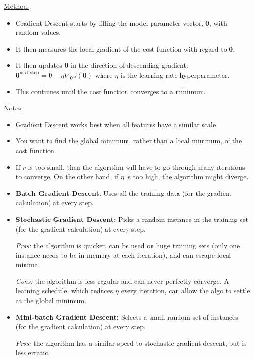 \underline{Method:}
\vspace{-3.0mm}
\begin{itemize}
\item
Gradient Descent starts by filling the model parameter vector, $\boldsymbol{\theta}$, with random values.
\item
It then measures the local gradient of the cost function with regard to $\boldsymbol{\theta}$.
\item
It then updates $\boldsymbol{\theta}$ in the direction of descending gradient:
$\boldsymbol{\theta}^{\textrm{next step}} = \boldsymbol{\theta} - \eta \nabla_{\boldsymbol{\theta}} J (\boldsymbol{\theta})$
\newline
where $\eta$ is the learning rate hyperparameter.
\item
This continues until the cost function converges to a minimum.
\end{itemize}

\underline{Notes:}
\vspace{-3.0mm}
\begin{itemize}
\item
Gradient Descent works best when all features have a similar scale.
\item
You want to find the global minimum, rather than a local minimum, of the cost function.
\item
If $\eta$ is too small, then the algorithm will have to go through many iterations to converge.\newline
On the other hand, if $\eta$ is too high, the algorithm might diverge.
\item
\textbf{Batch Gradient Descent:}\newline
Uses all the training data (for the gradient calculation) at every step.
\item
\textbf{Stochastic Gradient Descent:}\newline
Picks a random instance in the training set (for the gradient calculation) at every step.

\textit{Pros:} the algorithm is quicker, can be used on huge training sets (only one instance needs to be in memory at each iteration),
and can escape local minima.

\textit{Cons:} the algorithm is less regular and can never perfectly converge.
A learning schedule,
which reduces $\eta$ every iteration,
can allow the algo to settle at the global minimum.

\item
\textbf{Mini-batch Gradient Descent:}\newline
Selects a small random set of instances (for the gradient calculation) at every step.

\textit{Pros:} the algorithm has a similar speed to stochastic gradient descent, but is less erratic.
\end{itemize}


